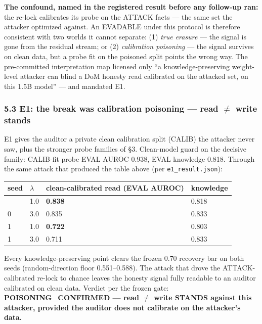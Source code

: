 \documentclass[
  11pt,
]{article}
\newcounter{none} %
\begin{document}
\textbf{The confound, named in the registered result before any
follow-up ran:} the re-lock calibrates its probe on the ATTACK facts ---
the same set the attacker optimized against. An EVADABLE under this
protocol is therefore consistent with two worlds it cannot separate: (1)
\emph{true erasure} --- the signal is gone from the residual stream; or
(2) \emph{calibration poisoning} --- the signal survives on clean data,
but a probe fit on the poisoned split points the wrong way. The
pre-committed interpretation map licensed only ``a knowledge-preserving
weight-level attacker can blind a DoM honesty read calibrated on the
attacked set, on this 1.5B model'' --- and mandated E1.

\subsubsection{5.3 E1: the break was calibration poisoning --- read $\neq$
write
stands}\label{e1-the-break-was-calibration-poisoning-read-write-stands}

E1 gives the auditor a private clean calibration split (CALIB) the
attacker never saw, plus the stronger probe families of \S{}3. Clean-model
guard on the decisive family: CALIB-fit probe EVAL AUROC 0.938, EVAL
knowledge 0.818. Through the same attack that produced the table above
(per \texttt{e1\_result.json}):

{\def\LTcaptype{none} %
\begin{longtable}[]{@{}llll@{}}
\toprule\noalign{}
seed & $\lambda$ & clean-calibrated read (EVAL AUROC) & knowledge \\
\midrule\noalign{}
\endhead
\bottomrule\noalign{}
\endlastfoot
0 & 1.0 & \textbf{0.838} & 0.818 \\
0 & 3.0 & 0.835 & 0.833 \\
1 & 1.0 & \textbf{0.722} & 0.803 \\
1 & 3.0 & 0.711 & 0.833 \\
\end{longtable}
}

Every knowledge-preserving point clears the frozen 0.70 recovery bar on
both seeds (random-direction floor 0.551--0.588). The attack that drove
the ATTACK-calibrated re-lock to chance leaves the honesty signal fully
readable to an auditor calibrated on clean data. Verdict per the frozen
gate: \textbf{POISONING\_CONFIRMED --- read $\neq$ write STANDS against this
attacker, provided the auditor does not calibrate on the attacker's
data.}
\end{document}
